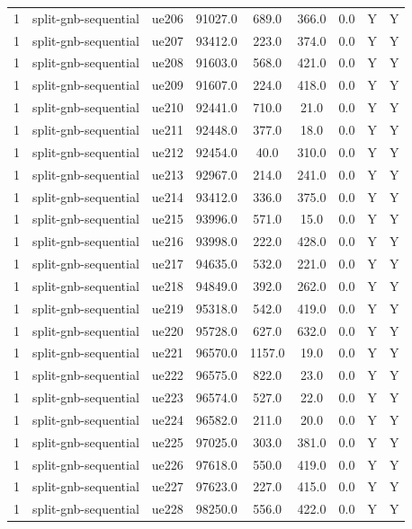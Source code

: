 \begin{table}[ht]
\begin{tabular}{|c|c|c|c|c|c|c|c|c|}
1 & split-gnb-sequential & ue206 & 91027.0 & 689.0 & 366.0 & 0.0 & Y & Y \\
1 & split-gnb-sequential & ue207 & 93412.0 & 223.0 & 374.0 & 0.0 & Y & Y \\
1 & split-gnb-sequential & ue208 & 91603.0 & 568.0 & 421.0 & 0.0 & Y & Y \\
1 & split-gnb-sequential & ue209 & 91607.0 & 224.0 & 418.0 & 0.0 & Y & Y \\
1 & split-gnb-sequential & ue210 & 92441.0 & 710.0 & 21.0 & 0.0 & Y & Y \\
1 & split-gnb-sequential & ue211 & 92448.0 & 377.0 & 18.0 & 0.0 & Y & Y \\
1 & split-gnb-sequential & ue212 & 92454.0 & 40.0 & 310.0 & 0.0 & Y & Y \\
1 & split-gnb-sequential & ue213 & 92967.0 & 214.0 & 241.0 & 0.0 & Y & Y \\
1 & split-gnb-sequential & ue214 & 93412.0 & 336.0 & 375.0 & 0.0 & Y & Y \\
1 & split-gnb-sequential & ue215 & 93996.0 & 571.0 & 15.0 & 0.0 & Y & Y \\
1 & split-gnb-sequential & ue216 & 93998.0 & 222.0 & 428.0 & 0.0 & Y & Y \\
1 & split-gnb-sequential & ue217 & 94635.0 & 532.0 & 221.0 & 0.0 & Y & Y \\
1 & split-gnb-sequential & ue218 & 94849.0 & 392.0 & 262.0 & 0.0 & Y & Y \\
1 & split-gnb-sequential & ue219 & 95318.0 & 542.0 & 419.0 & 0.0 & Y & Y \\
1 & split-gnb-sequential & ue220 & 95728.0 & 627.0 & 632.0 & 0.0 & Y & Y \\
1 & split-gnb-sequential & ue221 & 96570.0 & 1157.0 & 19.0 & 0.0 & Y & Y \\
1 & split-gnb-sequential & ue222 & 96575.0 & 822.0 & 23.0 & 0.0 & Y & Y \\
1 & split-gnb-sequential & ue223 & 96574.0 & 527.0 & 22.0 & 0.0 & Y & Y \\
1 & split-gnb-sequential & ue224 & 96582.0 & 211.0 & 20.0 & 0.0 & Y & Y \\
1 & split-gnb-sequential & ue225 & 97025.0 & 303.0 & 381.0 & 0.0 & Y & Y \\
1 & split-gnb-sequential & ue226 & 97618.0 & 550.0 & 419.0 & 0.0 & Y & Y \\
1 & split-gnb-sequential & ue227 & 97623.0 & 227.0 & 415.0 & 0.0 & Y & Y \\
1 & split-gnb-sequential & ue228 & 98250.0 & 556.0 & 422.0 & 0.0 & Y & Y \\

\end{tabular}
\end{table}
